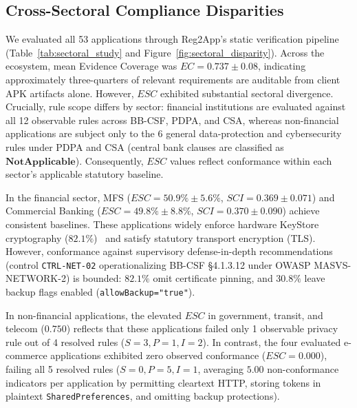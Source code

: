 \subsection{Cross-Sectoral Compliance Disparities}
\label{sec:ecosystem:disparity}

We evaluated all 53 applications through Reg2App's static verification pipeline (Table~\ref{tab:sectoral_study} and Figure~\ref{fig:sectoral_disparity}). Across the ecosystem, mean Evidence Coverage was $EC = 0.737 \pm 0.08$, indicating approximately three-quarters of relevant requirements are auditable from client APK artifacts alone. However, $ESC$ exhibited substantial sectoral divergence. Crucially, rule scope differs by sector: financial institutions are evaluated against all 12 observable rules across BB-CSF, PDPA, and CSA, whereas non-financial applications are subject only to the 6 general data-protection and cybersecurity rules under PDPA and CSA (central bank clauses are classified as $\mathbf{NotApplicable}$). Consequently, $ESC$ values reflect conformance within each sector's applicable statutory baseline.

In the financial sector, MFS ($ESC = 50.9\% \pm 5.6\%$, $SCI = 0.369 \pm 0.071$) and Commercial Banking ($ESC = 49.8\% \pm 8.8\%$, $SCI = 0.370 \pm 0.090$) achieve consistent baselines. These applications widely enforce hardware KeyStore cryptography ($82.1\%$)~\cite{ekberg_tee} and satisfy statutory transport encryption (TLS). However, conformance against supervisory defense-in-depth recommendations (control \texttt{CTRL-NET-02} operationalizing BB-CSF §4.1.3.12 under OWASP MASVS-NETWORK-2) is bounded: $82.1\%$ omit certificate pinning, and $30.8\%$ leave backup flags enabled (\texttt{allowBackup="true"}).

In non-financial applications, the elevated $ESC$ in government, transit, and telecom ($0.750$) reflects that these applications failed only 1 observable privacy rule out of 4 resolved rules ($S=3, P=1, I=2$). In contrast, the four evaluated e-commerce applications exhibited zero observed conformance ($ESC = 0.000$), failing all 5 resolved rules ($S=0, P=5, I=1$, averaging $5.00$ non-conformance indicators per application by permitting cleartext HTTP, storing tokens in plaintext \texttt{SharedPreferences}, and omitting backup protections).

